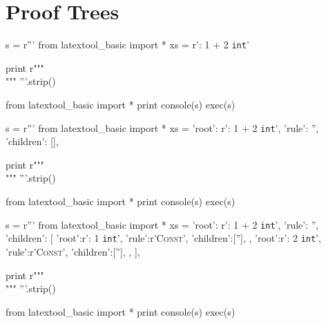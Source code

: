 \section{Proof Trees}


\begin{python}
s = r'''
from latextool_basic import *
xs = r'{\Gamma: 1 + 2 \vdash \texttt{int}}'
     
print r"""
\[
\]
""" %
'''.strip()

from latextool_basic import *
print console(s)
exec(s)
\end{python}



\begin{python}
s = r'''
from latextool_basic import *
xs = {'root': r'{\Gamma: 1 + 2 \vdash \texttt{int}}',
      'rule': '',
      'children': [],
     }
     
print r"""
\[
\]
""" %
'''.strip()

from latextool_basic import *
print console(s)
exec(s)
\end{python}





\newpage
\begin{python}
s = r'''
from latextool_basic import *
xs = {'root': r'{\Gamma: 1 + 2 \vdash \texttt{int}}',
      'rule': '',
      'children': [
        {'root':r'\Gamma: 1 \vdash \texttt{int}',
         'rule':r'\textsc{Const}',
         'children':[''],
        },
        {'root':r'\Gamma: 2 \vdash \texttt{int}',
         'rule':r'\textsc{Const}',
         'children':[''],
        },
      ],
     }
     
print r"""
\[
\]
""" %
'''.strip()

from latextool_basic import *
print console(s)
exec(s)
\end{python}
